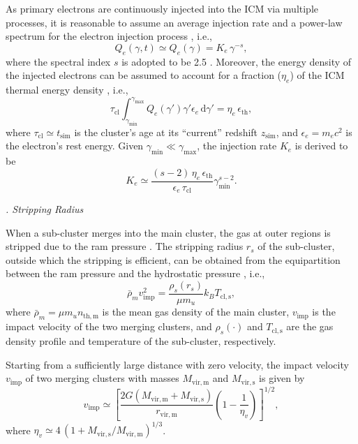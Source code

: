 \documentclass[twocolumn]{aastex62}
\newcommand{\R}[1]{\mathrm{#1}}
\newcommand{\D}[1]{\R{d} #1}
\newcommand{\editone}[1]{{\leavevmode\color{cyan}#1}}
\newcounter{sssseccount}
\newcommand{\sssseclabel}{\alph{sssseccount}}
\newcommand{\ssssec}[1]{%
  \vspace{1ex}%
  \stepcounter{sssseccount}%
  \noindent\emph{\sssseclabel. #1}%
}
\begin{document}
As primary electrons are continuously injected into the ICM via multiple
processes, it is reasonable to assume an average injection rate and a
power-law spectrum for the electron injection process
\citep[e.g.,][]{cassano2005,donnert2014}, i.e.,
\begin{equation}
  \label{eq:electron-inj}
  Q_e(\gamma, t) \simeq Q_e(\gamma) = K_e \,\gamma^{-s},
\end{equation}
where the spectral index $s$ is adopted to be 2.5 \citep{cassano2005}.
Moreover, the energy density of the injected electrons can be assumed to
account for a fraction ($\eta_e$) of the ICM thermal energy density
\citep{cassano2005}, i.e.,
\begin{equation}
  \tau_{\R{cl}} \int_{\gamma_{\R{min}}}^{\gamma_{\R{max}}}
  Q_e(\gamma') \gamma'\epsilon_e \,\D{\gamma'}
  = \eta_e \,\epsilon_{\R{th}},
\end{equation}
where $\tau_{\R{cl}} \simeq t_{\R{sim}}$ is the cluster's age at its
\enquote{current} redshift $z_{\R{sim}}$,
and $\epsilon_e = m_e c^2$ is the electron's rest energy.
Given $\gamma_{\R{min}} \ll \gamma_{\R{\max}}$, the injection rate $K_e$
is derived to be
\begin{equation}
  \label{eq:injrate}
  K_e \simeq \frac{(s-2)\,\eta_e\,\epsilon_{\R{th}}}{\epsilon_e\,\tau_{\R{cl}}}
    \gamma_{\R{min}}^{s-2}.
\end{equation}

\ssssec{\editone{Stripping Radius}}

\editone{%
When a sub-cluster merges into the main cluster, the gas at outer regions
is stripped due to the ram pressure \citep{gunn1972}.
The stripping radius $r_s$ of the sub-cluster, outside which the stripping
is efficient, can be obtained from the equipartition between the ram
pressure and the hydrostatic pressure \citep{cassano2005}, i.e.,
\begin{equation}
  \label{eq:rs-eqp}
  \bar{\rho}_m v_{\R{imp}}^2 = \frac{\rho_s(r_s)}{\mu m_u} k_B T_{\R{cl,s}},
\end{equation}
where
$\bar{\rho}_m = \mu m_u n_{\R{th,m}}$ is the mean gas density of the main
cluster,
$v_{\R{imp}}$ is the impact velocity of the two merging clusters,
and $\rho_s(\cdot)$ and $T_{\R{cl,s}}$ are the gas density profile and
temperature of the sub-cluster, respectively.}

Starting from a sufficiently large distance with zero velocity,
the impact velocity $v_{\R{imp}}$ of two merging clusters with
masses $M_{\R{vir,m}}$ and $M_{\R{vir,s}}$ is given by
\citep{sarazin2002,cassano2005}
\begin{equation}
  \label{eq:v-imp}
  v_{\R{imp}} \simeq \left[
    \frac{2G (M_{\R{vir,m}} + M_{\R{vir,s}})}{r_{\R{vir,m}}}
    \left( 1 - \frac{1}{\eta_v} \right)\right]^{1/2},
\end{equation}
where $\eta_v \simeq 4 \,(1 + M_{\R{vir,s}}/M_{\R{vir,m}})^{1/3}$.
\end{document}
